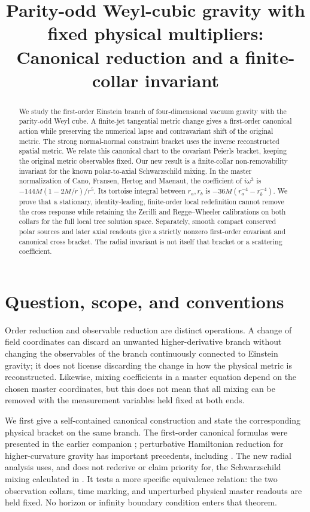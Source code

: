 \documentclass[11pt]{article}
\title{Parity-odd Weyl-cubic gravity with fixed physical multipliers:\\
Canonical reduction and a finite-collar invariant}
\author{}
\date{}
\begin{document}
\maketitle

\begin{abstract}
We study the first-order Einstein branch of four-dimensional vacuum gravity with the parity-odd Weyl cube. A finite-jet tangential metric change gives a first-order canonical action while preserving the numerical lapse and contravariant shift of the original metric. The strong normal-normal constraint bracket uses the inverse reconstructed spatial metric. We relate this canonical chart to the covariant Peierls bracket, keeping the original metric observables fixed. Our new result is a finite-collar non-removability invariant for the known polar-to-axial Schwarzschild mixing. In the master normalization of Cano, Fransen, Hertog and Maenaut, the coefficient of \(i\omega^3\) is \(-144M(1-2M/r)/r^5\). Its tortoise integral between \(r_a,r_b\) is \(-36M(r_a^{-4}-r_b^{-4})\). We prove that a stationary, identity-leading, finite-order local redefinition cannot remove the cross response while retaining the Zerilli and Regge--Wheeler calibrations on both collars for the full local tree solution space. Separately, smooth compact conserved polar sources and later axial readouts give a strictly nonzero first-order covariant and canonical cross bracket. The radial invariant is not itself that bracket or a scattering coefficient.
\end{abstract}

\section{Question, scope, and conventions}

Order reduction and observable reduction are distinct operations. A change of field coordinates can discard an unwanted higher-derivative branch without changing the observables of the branch continuously connected to Einstein gravity; it does not license discarding the change in how the physical metric is reconstructed. Likewise, mixing coefficients in a master equation depend on the chosen master coordinates, but this does not mean that all mixing can be removed with the measurement variables held fixed at both ends.

We first give a self-contained canonical construction and state the corresponding physical bracket on the same branch. The first-order canonical formulas were presented in the earlier companion \cite{Paper27}; perturbative Hamiltonian reduction for higher-curvature gravity has important precedents, including \cite{GMZ}. The new radial analysis uses, and does not rederive or claim priority for, the Schwarzschild mixing calculated in \cite{Cano}. It tests a more specific equivalence relation: the two observation collars, time marking, and unperturbed physical master readouts are held fixed. No horizon or infinity boundary condition enters that theorem.
\end{document}
